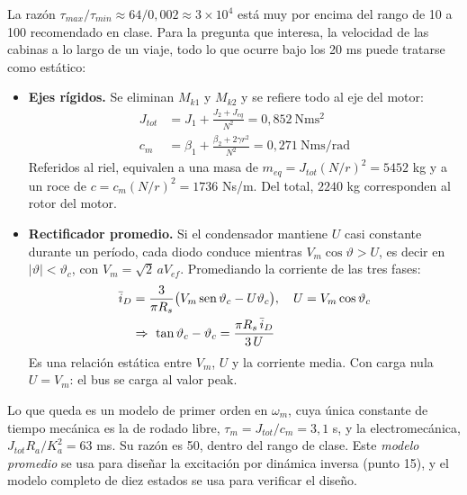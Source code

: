 \documentclass[10pt,a4paper,twocolumn]{article}
\DeclareMathOperator{\sen}{sen}
\begin{document}
La razón $\tau_{max}/\tau_{min} \approx 64/0{,}002 \approx 3\times10^{4}$ está muy por
encima del rango de 10 a 100 recomendado en clase. Para la pregunta que interesa, la
velocidad de las cabinas a lo largo de un viaje, todo lo que ocurre bajo los 20 ms puede
tratarse como estático:
\begin{itemize}
  \item \textbf{Ejes rígidos.} Se eliminan $M_{k1}$ y $M_{k2}$ y se refiere todo al eje del
        motor:
        \begin{align*}
          J_{tot} &= J_1 + \frac{J_2 + J_{eq}}{N^2} = 0{,}852\ \mathrm{Nms^2} \\
          c_m     &= \beta_1 + \frac{\beta_2 + 2\gamma r^2}{N^2} = 0{,}271\ \mathrm{Nms/rad}
        \end{align*}
        Referidos al riel, equivalen a una masa de $m_{eq} = J_{tot}(N/r)^2 = 5452$ kg y a un
        roce de $c = c_m (N/r)^2 = 1736$ Ns/m. Del total, $2240$ kg corresponden al rotor del
        motor.
  \item \textbf{Rectificador promedio.} Si el condensador mantiene $U$ casi constante
        durante un período, cada diodo conduce mientras $V_m\cos\vartheta > U$, es decir en
        $|\vartheta|<\vartheta_c$, con $V_m = \sqrt2\,aV_{ef}$. Promediando la corriente de
        las tres fases:
        \begin{align}
          \bar i_D &= \frac{3}{\pi R_s}\big(V_m\sen\vartheta_c - U\vartheta_c\big),
          \quad U = V_m\cos\vartheta_c \notag\\
          &\Rightarrow\ \tan\vartheta_c - \vartheta_c = \frac{\pi R_s\, \bar i_D}{3\,U}
          \label{eq:rect}
        \end{align}
        Es una relación estática entre $V_m$, $U$ y la corriente media. Con carga nula
        $U = V_m$: el bus se carga al valor peak.
\end{itemize}
Lo que queda es un modelo de primer orden en $\omega_m$, cuya única constante de tiempo
mecánica es la de rodado libre, $\tau_m = J_{tot}/c_m = 3{,}1$ s, y la electromecánica,
$J_{tot}R_a/K_a^2 = 63$ ms. Su razón es 50, dentro del rango de clase. Este \emph{modelo
promedio} se usa para diseñar la excitación por dinámica inversa (punto 15), y el modelo
completo de diez estados se usa para verificar el diseño.
\end{document}
